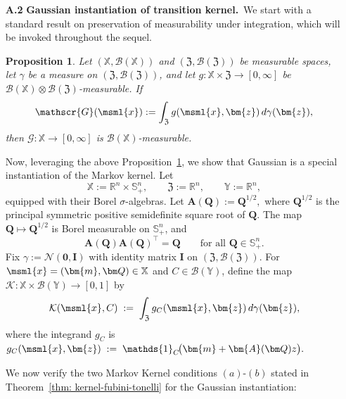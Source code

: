 \documentclass[opre,sglanonrev]{informs4}
\newtheorem{proposition}{Proposition}
\newtheorem{remark}{Remark}
\newcommand{\mK}{\mathcal{K}}          %
\newcommand{\mL}{\mathcal{L}}          %
\newcommand{\mN}{\mathcal{N}}
\newcommand{\mB}{\mathcal{B}}
\newcommand{\mfZ}{\mathfrak{Z}}
\newcommand{\mbX}{\mathbb{X}}
\newcommand{\mbY}{\mathbb{Y}}
\newcommand{\mbR}{\mathbb R}
\newcommand{\mbS}{\mathbb S}
\newcommand{\ind}{\mathds{1}}
\newcommand{\bzero}{\bm{0}}
\newcommand{\bmean}{\bm{m}}
\newcommand{\bz}{\bm{z}}
\newcommand{\bA}{\bm{A}}
\newcommand{\bI}{\bm{I}}
\newcommand{\bQ}{\bm Q}
\begin{document}
{\begin{APPENDICES}
\begin{itemize}[leftmargin=1em]
\begin{remark}[Interchanging the kernel integration order]
The kernel \(\mK(\msml{x},d\msml{y})\) defines the joint measure
\[
\eta(d\msml{x},d\msml{y})
=
\nu_\msml{x}(d\msml{x})\,\mK(\msml{x},d\msml{y}).
\]
If a reverse conditional kernel \(\mL(\msml{y},d\msml{x})\) exists, i.e.,
\(\eta(d\msml{x},d\msml{y})
=
\nu_\msml{y}(d\msml{y})\,\mL(\msml{y},d\msml{x})\), then for every nonnegative
measurable \(F:\mbX\times\mbY\to[0,\infty]\),
\[
\int_{\mbX\times\mbY}F\,d\eta
=
\int_{\mbX}\!\int_{\mbY}F(\msml{x},\msml{y})\,\mK(\msml{x},d\msml{y})\,d\nu_\msml{x}(\msml{x})
=
\int_{\mbY}\!\int_{\mbX}F(\msml{x},\msml{y})\,\mL(\msml{y},d\msml{x})\,d\nu_\msml{y}(\msml{y}).
\]
Thus, the reverse-order expression requires the reverse kernel \(\mL\), not
\(\mK(d\msml{x},\msml{y})\).
\end{remark}

\item[\textbf{A.2}]\textbf{Gaussian instantiation of transition kernel.}\,  
We start with a standard result on preservation of measurability under integration, which will be invoked throughout the sequel.
\begin{proposition}\label{prop: measurability}
Let \((\mbX,\mB(\mbX))\) and \((\mfZ,\mB(\mfZ))\) be measurable spaces, let \(\gamma\) be a measure on \((\mfZ,\mB(\mfZ))\), and let $g:\mbX\times \mfZ\to [0,\infty]$ be \(\mB(\mbX)\otimes \mB(\mfZ)\)-measurable. If
\[
\mathscr{G}(\msml{x}):=\int_{\mfZ} g(\msml{x},\bz)\,d\gamma(\bz),
\]
then \(\mathscr{G}:\mbX\to[0,\infty]\) is \(\mB(\mbX)\)-measurable.
\end{proposition}
Now, leveraging the above Proposition~\ref{prop: measurability}, we show that Gaussian is a special instantiation of the Markov kernel.
Let
\[
\mbX := \mbR^n \times \mbS_+^n, 
\qquad
\mfZ := \mbR^n,
\qquad
\mbY := \mbR^n,
\]
equipped with their Borel \(\sigma\)-algebras. Let $\bA(\bQ):=\bQ^{1/2},$
where \(\bQ^{1/2}\) is the principal symmetric positive semidefinite square root
of \(\bQ\). The map \(\bQ\mapsto \bQ^{1/2}\) is Borel measurable on
\(\mbS_+^n\), and
\[
\bA(\bQ)\bA(\bQ)^\top=\bQ\qquad\text{for all }\bQ\in\mbS_+^n.
\]
Fix \(\gamma := \mN(\bzero,\bI)\) with identity matrix $\bI$ on \((\mfZ,\mB(\mfZ))\). For \(\msml{x}=(\bmean,\bQ)\in\mbX\) and \(C\in\mB(\mbY)\), define the map
\(\mK:\mbX\times\mB(\mbY)\to[0,1]\) by
\[
\mK(\msml{x},C)\;:=\;\int_{\mfZ} g_C(\msml{x},\bz)\,d\gamma(\bz),
\]
where the integrand \(g_C\) is $g_C(\msml{x},\bz)\;:=\;\ind_C\!\big(\bmean + \bA(\bQ)z\big).$

We now verify the two Markov Kernel conditions $(a)$-$(b)$ stated in Theorem~\ref{thm: kernel-fubini-tonelli} for the Gaussian instantiation:


\end{itemize}
\end{APPENDICES}}
\end{document}

